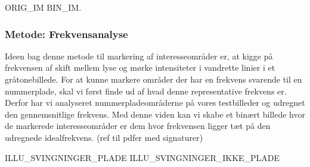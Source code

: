 ORIG\_IM BIN\_IM.


\subsubsection{Metode: Frekvensanalyse}
\label{sec_frekvensanalyse} 
Ideen bag denne metode til markering af interesseområder er, at kigge på frekvensen af skift mellem lyse og mørke intensiteter i vandrette linier i et gråtonebillede. For at kunne markere områder der har en frekvens svarende til en nummerplade, skal vi først finde ud af hvad denne representative frekvens er. Derfor har vi analyseret nummerpladeområderne på vores testbilleder og udregnet den gennemsnitlige frekvens. Med denne viden kan vi skabe et binært billede hvor de markerede interesseområder er dem hvor frekvensen ligger tæt på den udregnede idealfrekvens. (ref til pdfer med signaturer)

ILLU\_SVINGNINGER\_PLADE ILLU\_SVINGNINGER\_IKKE\_PLADE

